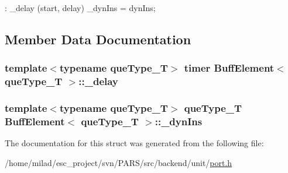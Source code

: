 \begin{DoxyCode}
                : _delay (start, delay) 
        {
                _dynIns = dynIns;
        }
\end{DoxyCode}


\subsection{Member Data Documentation}
\hypertarget{structBuffElement_ada387ae6cbadda86ba737303ee0efb65}{
\subsubsection[{\_\-delay}]{\setlength{\rightskip}{0pt plus 5cm}template$<$typename queType\_\-T$>$ {\bf timer} {\bf BuffElement}$<$ queType\_\-T $>$::{\bf \_\-delay}}}
\label{structBuffElement_ada387ae6cbadda86ba737303ee0efb65}
\hypertarget{structBuffElement_aa61484d95939f5b8f0bdc06321b0fbcf}{
\subsubsection[{\_\-dynIns}]{\setlength{\rightskip}{0pt plus 5cm}template$<$typename queType\_\-T$>$ queType\_\-T {\bf BuffElement}$<$ queType\_\-T $>$::{\bf \_\-dynIns}}}
\label{structBuffElement_aa61484d95939f5b8f0bdc06321b0fbcf}


The documentation for this struct was generated from the following file:\begin{DoxyCompactItemize}
\item 
/home/milad/esc\_\-project/svn/PARS/src/backend/unit/\hyperlink{port_8h}{port.h}\end{DoxyCompactItemize}
